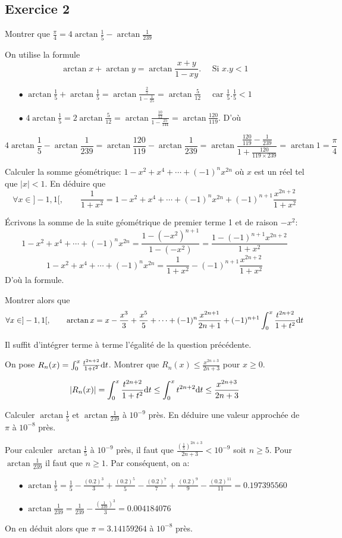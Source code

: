 \documentclass{article}[11pt]
\def \de {{\rm d}}
\begin{document}
\subsection*{Exercice 2}
\begin{enumerate}
{\color{blue}
\item Montrer que $\frac{\pi}{4}=4\arctan\frac 15-\arctan\frac{1}{239}$
}

On utilise la formule
\[\arctan x +\arctan y =\arctan\frac{x+y}{1-xy}.\quad \mbox{ Si } x.y < 1\]
\begin{itemize}
\item[$\bullet$] $\displaystyle \arctan \frac 15 +\arctan \frac 15=\arctan\frac{\frac 25}{1-\frac{1}{25}}=\arctan\frac{5}{12}\quad \mbox{ car } \frac 15.\frac 15 < 1$
\item[$\bullet$] $\displaystyle 4\arctan\frac 15=2\arctan\frac{5}{12}=\arctan\frac{\frac{10}{12}}{1-\frac{25}{144}}=\arctan\frac{120}{119}$. D'où
\end{itemize}
\[4\arctan\frac 15-\arctan\frac{1}{239}=\arctan\frac{120}{119}-\arctan\frac{1}{239}=\arctan\frac{\frac{120}{119}-\frac{1}{239}}{1+\frac{120}{119\times 239}}=\arctan 1=\frac{\pi}{4}\]
{\color{blue}
\item Calculer la somme géométrique: $1-x^2+x^4+\cdots +(-1)^nx^{2n}$ où $x$  est un réel tel que $|x|<1$. En déduire que
\[\forall x\in ]-1,1[,\qquad \frac{1}{1+x^2}=1-x^2+x^4+\cdots +(-1)^nx^{2n}+(-1)^{n+1}\frac{x^{2n+2}}{1+x^2}\]
}
Écrivons la somme de la suite géométrique de premier terme 1 et de raison $-x^2$:
\[1-x^2+x^4+\cdots +(-1)^nx^{2n}=\frac{1-(-x^2)^{n+1}}{1-(-x^2)}=\frac{1-(-1)^{n+1}x^{2n+2}}{1+x^2} \]
\[1-x^2+x^4+\cdots +(-1)^nx^{2n}=\frac{1}{1+x^2}-(-1)^{n+1}\frac{x^{2n+2}}{1+x^2} \]
D'où la formule.
{\color{blue}
\item Montrer alors que
\[\forall x\in ]-1,1[,\qquad \arctan x=x-\frac{x^3}3+\frac{x^5}5+\cdots +(-1)^n\frac{x^{2n+1}}{2n+1}+(-1)^{n+1}\int_0^x\frac{t^{2n+2}}{1+t^2}\de t\]
}
Il suffit d'intégrer terme à terme l'égalité de la question précédente.
{\color{blue}
\item On pose $R_n(x)=\int_0^x\frac{t^{2n+2}}{1+t^2}\de t$. Montrer que $R_n(x)\leq\frac{x^{2n+3}}{2n+3}$ pour $x\geq 0$.}
\[|R_n(x)|=\int_0^x\frac{t^{2n+2}}{1+t^2}\de t\leq \int_0^xt^{2n+2}\de t\leq \frac{x^{2n+3}}{2n+3}\]

{\color{blue}
\item Calculer $\arctan\frac 15$ et $\arctan\frac{1}{239}$ à $10^{-9}$ près. En déduire une valeur approchée de $\pi$ à $10^{-8}$ près. 
}
Pour calculer $\arctan\frac 15$ à $10^{-9}$ près, il faut que $\frac{\left(\frac 15\right)^{2n+3}}{2n+3}<10^{-9}$ soit $n\geq 5$. Pour $\arctan\frac{1}{239}$ il faut que $n\geq 1$. Par conséquent, on a:
\begin{itemize}
\item[$\bullet$] $\displaystyle \arctan\frac 15=\frac 15 -\frac{(0.2)^3}{3}+\frac{(0.2)^5}{5}-\frac{(0.2)^7}{7}+\frac{(0.2)^9}{9}-\frac{(0.2)^{11}}{11}=0.197395560$
\item[$\bullet$] $\displaystyle \arctan\frac 1{239}=\frac 1{239}-\frac{\left(\frac 1{239}\right)^3}{3}=0.004184076$
\end{itemize}
On en déduit alors que $\pi=3.14159264$ à $10^{-8}$ près.
\end{enumerate}
\end{document}
